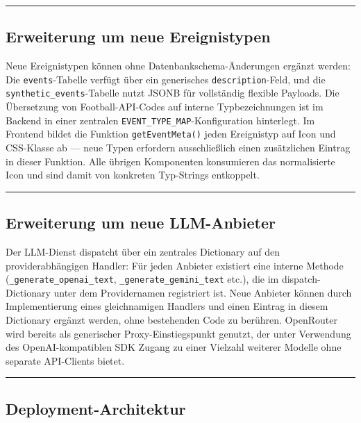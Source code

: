 \begin{center}\rule{0.5\linewidth}{0.5pt}\end{center}

\subsection{Erweiterung um neue
Ereignistypen}\label{erweiterung-um-neue-ereignistypen}

Neue Ereignistypen können ohne Datenbankschema-Änderungen ergänzt
werden: Die \texttt{events}-Tabelle verfügt über ein generisches
\texttt{description}-Feld, und die \texttt{synthetic\_events}-Tabelle
nutzt JSONB für vollständig flexible Payloads. Die Übersetzung von
Football-API-Codes auf interne Typbezeichnungen ist im Backend in einer
zentralen \texttt{EVENT\_TYPE\_MAP}-Konfiguration hinterlegt. Im
Frontend bildet die Funktion \texttt{getEventMeta()} jeden Ereignistyp
auf Icon und CSS-Klasse ab --- neue Typen erfordern ausschließlich einen
zusätzlichen Eintrag in dieser Funktion. Alle übrigen Komponenten
konsumieren das normalisierte Icon und sind damit von konkreten
Typ-Strings entkoppelt.

\begin{center}\rule{0.5\linewidth}{0.5pt}\end{center}

\subsection{Erweiterung um neue
LLM-Anbieter}\label{erweiterung-um-neue-llm-anbieter}

Der LLM-Dienst dispatcht über ein zentrales Dictionary auf den
providerabhängigen Handler: Für jeden Anbieter existiert eine interne
Methode (\texttt{\_generate\_openai\_text},
\texttt{\_generate\_gemini\_text} etc.), die im dispatch-Dictionary
unter dem Providernamen registriert ist. Neue Anbieter können durch
Implementierung eines gleichnamigen Handlers und einen Eintrag in diesem
Dictionary ergänzt werden, ohne bestehenden Code zu berühren. OpenRouter
wird bereits als generischer Proxy-Einstiegspunkt genutzt, der unter
Verwendung des OpenAI-kompatiblen SDK Zugang zu einer Vielzahl weiterer
Modelle ohne separate API-Clients bietet.

\begin{center}\rule{0.5\linewidth}{0.5pt}\end{center}

\subsection{Deployment-Architektur}\label{deployment-architektur}

